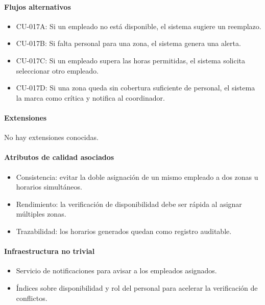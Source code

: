 \paragraph{Flujos alternativos}
\begin{itemize}[leftmargin=1.4em, topsep=1pt]
  \item CU-017A: Si un empleado no está disponible, el sistema sugiere un reemplazo.
  \item CU-017B: Si falta personal para una zona, el sistema genera una alerta.
  \item CU-017C: Si un empleado supera las horas permitidas, el sistema solicita seleccionar otro empleado.
  \item CU-017D: Si una zona queda sin cobertura suficiente de personal, el sistema la marca como crítica y notifica al coordinador.
\end{itemize}

\paragraph{Extensiones}
No hay extensiones conocidas.

\paragraph{Atributos de calidad asociados}
\begin{itemize}[leftmargin=1.4em, topsep=1pt]
  \item Consistencia: evitar la doble asignación de un mismo empleado a dos zonas u horarios simultáneos.
  \item Rendimiento: la verificación de disponibilidad debe ser rápida al asignar múltiples zonas.
  \item Trazabilidad: los horarios generados quedan como registro auditable.
\end{itemize}

\paragraph{Infraestructura no trivial}
\begin{itemize}[leftmargin=1.4em, topsep=1pt]
  \item Servicio de notificaciones para avisar a los empleados asignados.
  \item Índices sobre disponibilidad y rol del personal para acelerar la verificación de conflictos.
\end{itemize}

